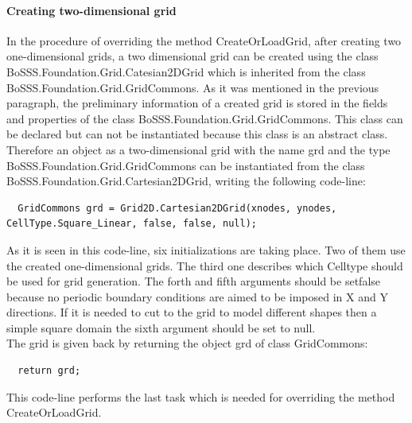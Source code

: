 \documentclass[11pt,twoside,a4paper]{fdyartcl}
\begin{document}
\paragraph{Creating two-dimensional grid} In the procedure of overriding the method {\scriptsize CreateOrLoadGrid}, after creating two one-dimensional grids, a two dimensional grid can be created using the class {\scriptsize BoSSS.Foundation.Grid.Catesian2DGrid} which is inherited from the class {\scriptsize BoSSS.Foundation.Grid.GridCommons}. As it was mentioned in the previous paragraph, the preliminary information of a created grid is stored in the fields and properties of the class {\scriptsize BoSSS.Foundation.Grid.GridCommons}. This class can be declared but can not be instantiated because this class is an abstract class. Therefore an object as a two-dimensional grid with the name {\scriptsize grd} and the type {\scriptsize BoSSS.Foundation.Grid.GridCommons} can be instantiated from the class {\scriptsize BoSSS.Foundation.Grid.Cartesian2DGrid}, writing the following code-line:
{\scriptsize \begin{verbatim}
  GridCommons grd = Grid2D.Cartesian2DGrid(xnodes, ynodes, CellType.Square_Linear, false, false, null);
\end{verbatim}}
As it is seen in this code-line, six initializations are taking place. Two of them use the created one-dimensional grids. The third one describes which Celltype should be used for grid generation. The forth and fifth arguments should be set{\scriptsize false} because no periodic boundary conditions are aimed to be imposed in X and Y directions. If it is needed to cut to the grid to model different shapes then a simple square domain the sixth argument should be set to {\scriptsize null}.\\
The grid is given back by returning the object grd of class GridCommons:
{\scriptsize \begin{verbatim}
  return grd;
\end{verbatim}}
This code-line performs the last task which is needed for overriding the method {\scriptsize CreateOrLoadGrid}.\\
\end{document}
